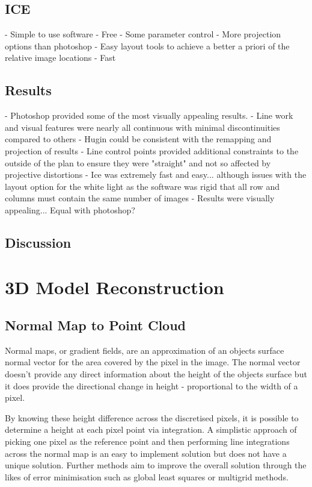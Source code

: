	\subsection{ICE}
	- Simple to use software
	- Free 
	- Some parameter control
		- More projection options than photoshop
	- Easy layout tools to achieve a better a priori of the relative image locations
	- Fast
	
	\subsection{Results}
	- Photoshop provided some of the most visually appealing results.
		- Line work and visual features were nearly all continuous with minimal discontinuities compared to others
	- Hugin could be consistent with the remapping and projection of results
		- Line control points provided additional constraints to the outside of the plan to ensure they were "straight" and not so affected by projective distortions
	- Ice was extremely fast and easy... although issues with the layout option for the white light as the software was rigid that all row and columns must contain the same number of images
	- Results were visually appealing... Equal with photoshop?

	\subsection{Discussion}

\section{3D Model Reconstruction}

	\subsection{Normal Map to Point Cloud}
	Normal maps, or gradient fields, are an approximation of an objects surface normal vector for the area covered by the pixel in the image. The normal vector doesn't provide any direct information about the height of the objects surface but it does provide the directional change in height - proportional to the width of a pixel.
	
	By knowing these height difference across the discretised pixels, it is possible to determine a height at each pixel point via integration. A simplistic approach of picking one pixel as the reference point and then performing line integrations across the normal map is an easy to implement solution but does not have a unique solution. Further methods aim to improve the overall solution through the likes of error minimisation such as global least squares or multigrid methods.
	
